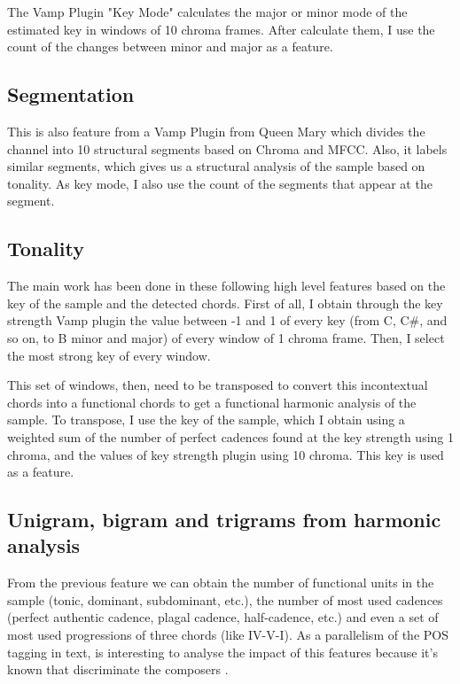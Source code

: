 \documentclass{article}
\begin{document}
The Vamp Plugin "Key Mode" calculates the major or minor mode of the estimated key in windows of 10 chroma frames. After calculate them, I use the count of the changes between minor and major as a feature.

\subsection{Segmentation}\label{subsec:segmentation}

This is also feature from a Vamp Plugin from Queen Mary which divides the channel into 10 structural segments based on Chroma and MFCC. Also, it labels similar segments, which gives us a structural analysis of the sample based on tonality. As key mode, I also use the count of the segments that appear at the segment.

\subsection{Tonality}\label{subsec:chord_windows}

The main work has been done in these following high level features based on the key of the sample and the detected chords. First of all, I obtain through the key strength Vamp plugin the value between -1 and 1 of every key (from C, C\#, and so on, to B minor and major) of every window of 1 chroma frame. Then, I select the most strong key of every window.

This set of windows, then, need to be transposed to convert this incontextual chords into a functional chords to get a functional harmonic analysis of the sample. To transpose, I use the key of the sample, which I obtain using a weighted sum of the number of perfect cadences found at the key strength using 1 chroma, and the values of key strength plugin using 10 chroma. This key is used as a feature.

\subsection{Unigram, bigram and trigrams from harmonic analysis}\label{subsec:uni_bi_tri}

From the previous feature we can obtain the number of functional units in the sample (tonic, dominant, subdominant, etc.), the number of most used cadences (perfect authentic cadence, plagal cadence, half-cadence, etc.) and even a set of most used progressions of three chords (like IV-V-I). As a parallelism of the POS tagging in text, is interesting to analyse the impact of this features because it's known that discriminate the composers \cite{desportes}.
\end{document}
